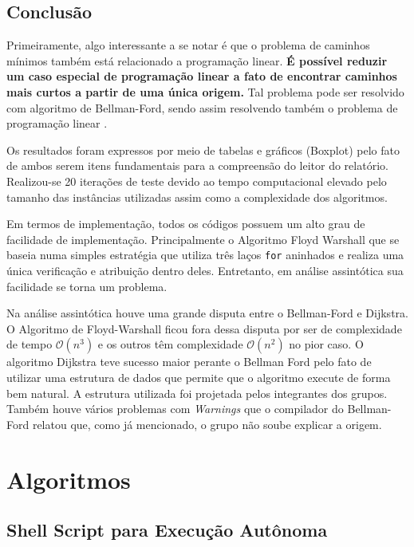 \documentclass[12pt]{article}
\begin{document}
\subsection{Conclusão}\label{sec:figs}

Primeiramente, algo interessante a se notar é que o problema de caminhos mínimos também está relacionado a programação linear. \textbf{É possível reduzir um caso especial de programação linear a fato de encontrar caminhos mais curtos a partir de uma única origem.} Tal problema pode ser resolvido com algoritmo de Bellman-Ford, sendo assim resolvendo também o problema de programação linear \cite{cormen2002algoritmos}.

Os resultados foram expressos por meio de tabelas e gráficos (Boxplot) pelo fato de ambos serem itens fundamentais para a compreensão do leitor do relatório. Realizou-se 20 iterações de teste devido ao tempo computacional elevado pelo tamanho das instâncias utilizadas assim como a complexidade dos algoritmos. 

Em termos de implementação, todos os códigos possuem um alto grau de facilidade de implementação. Principalmente o Algoritmo Floyd Warshall que se baseia numa simples estratégia que utiliza três laços \texttt{for} aninhados e realiza uma única verificação e atribuição dentro deles. Entretanto, em análise assintótica sua facilidade se torna um problema.

Na análise assintótica houve uma grande disputa entre o Bellman-Ford e Dijkstra. O Algoritmo de Floyd-Warshall ficou fora dessa disputa por ser de complexidade de tempo  $\mathcal{O}(n^3)$ e os outros têm complexidade  $\mathcal{O}(n^2)$ no pior caso. O algoritmo Dijkstra teve sucesso maior perante o Bellman Ford pelo fato de utilizar uma estrutura de dados que permite que o algoritmo execute de forma bem natural. A estrutura utilizada foi projetada pelos integrantes dos grupos. Também houve vários problemas com \textit{Warnings} que o compilador do Bellman-Ford relatou que, como já mencionado, o grupo não soube explicar a origem.

\section{Algoritmos} \label{sec:algoritmos}
\subsection{Shell Script para Execução Autônoma}
\end{document}
